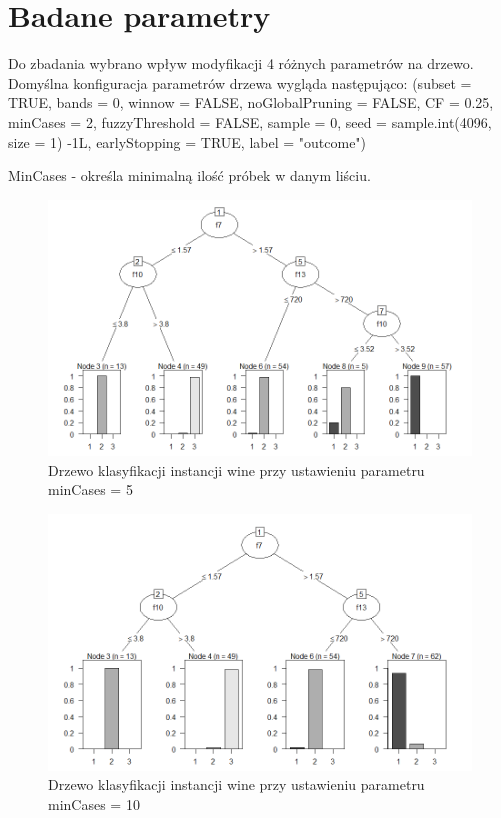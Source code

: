 \documentclass[12pt,a4paper]{article}
\begin{document}
\section{Badane parametry}
Do zbadania wybrano wpływ modyfikacji 4 różnych parametrów na drzewo. Domyślna konfiguracja parametrów drzewa wygląda następująco:
(subset = TRUE, bands = 0, winnow = FALSE, noGlobalPruning = FALSE, CF = 0.25, minCases = 2, fuzzyThreshold = FALSE, sample = 0, seed = sample.int(4096, size = 1) -1L, earlyStopping = TRUE, label = "outcome")

MinCases - określa minimalną ilość próbek w danym liściu.

\begin{figure}[H]
\centering
\includegraphics[width=1\textwidth]{wineMinCase5.png}
\caption{Drzewo klasyfikacji instancji wine przy ustawieniu parametru minCases = 5}
\end{figure}

\begin{figure}[H]
\centering
\includegraphics[width=1\textwidth]{wineMinCase10.png}
\caption{Drzewo klasyfikacji instancji wine przy ustawieniu parametru minCases = 10}
\end{figure}
\end{document}
